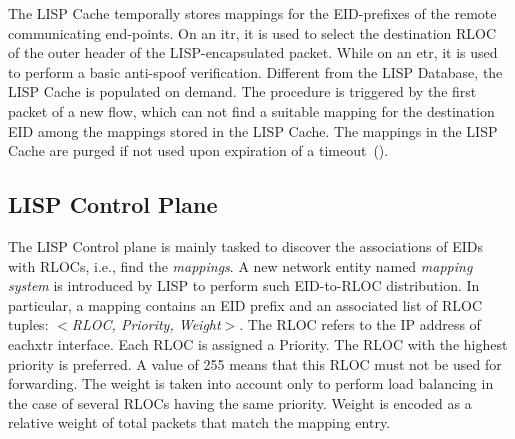 The LISP Cache temporally stores mappings for the EID-prefixes of the remote communicating end-points. On an \acrshort{itr}, it is used to select the destination RLOC of the outer header of the LISP-encapsulated packet. While on an \acrshort{etr}, it is used to perform a basic anti-spoof verification. Different from the LISP Database, the LISP Cache is populated on demand. The procedure is triggered by the first packet of a new flow, which can not find a suitable mapping for the destination EID among the mappings stored in the LISP Cache. The mappings in the LISP Cache are purged if not used upon expiration of a timeout~(\cite{lispCacheCost,lispCacheDive,lispCacheLRU,lispCacheModel}).

\subsection{LISP Control Plane}
\label{sec:control_plane}

The LISP Control plane is mainly tasked to discover the associations of EIDs with RLOCs, i.e., find the \emph{mappings}. A new network entity named \emph{mapping system} is introduced by LISP to perform such EID-to-RLOC distribution. In particular, a mapping contains an EID prefix and an associated list of RLOC tuples: \emph{$<$RLOC, Priority, Weight$>$}. The RLOC refers to the IP address of each\acrshort{xtr} interface. Each RLOC is assigned a Priority. The RLOC with the highest priority is preferred. %
A value of 255 means that this RLOC must not be used for forwarding. The weight is taken into account only to perform load balancing in the case of several RLOCs having the same priority. Weight is encoded as a relative weight of total packets that match the mapping entry.


